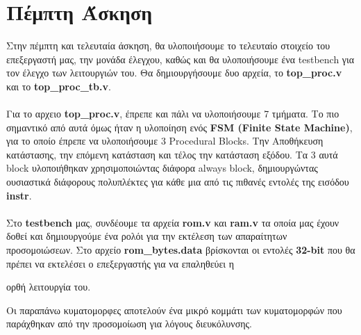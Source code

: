 \documentclass[a4paper,12pt]{report}
\def\tl{\textlatin}
\begin{document}
\chapter{Πέμπτη Άσκηση}
    \large Στην πέμπτη και τελευταία άσκηση, θα υλοποιήσουμε το τελευταίο στοιχείο του επεξεργαστή μας, την μονάδα έλεγχου, καθώς και θα υλοποιήσουμε ένα testbench για τον έλεγχο των λειτουργιών του. Θα δημιουργήσουμε δυο αρχεία, το \textbf{\tl{top\_proc.v}} και το \textbf{\tl{top\_proc\_tb.v}}. \\ \\
    Για το αρχειο \textbf{\tl{top\_proc.v}}, έπρεπε και πάλι να υλοποιήσουμε 7 τμήματα. Το πιο σημαντικό από αυτά όμως ήταν η υλοποίηση ενός \textbf{\tl{FSM (Finite State Machine)}}, για το οποίο έπρεπε να υλοποιήσουμε 3 \tl{Procedural Blocks}. Την Αποθήκευση κατάστασης, την επόμενη κατάσταση και τέλος την κατάσταση εξόδου. Τα 3 αυτά \tl{block} υλοποιήθηκαν χρησιμοποιώντας διάφορα \tl{always block}, δημιουργώντας ουσιαστικά διάφορους πολυπλέκτες για κάθε μια από τις πιθανές εντολές της εισόδου \textbf{\tl{instr}}.\\ \\
    Στο \textbf{\tl{testbench}} μας, συνδέουμε τα αρχεία \textbf{\tl{rom.v}} και \textbf{\tl{ram.v}} τα οποία μας έχουν δοθεί και δημιουργούμε ένα ρολόι για την εκτέλεση των απαραίτητων προσομοιώσεων. Στο αρχείο \textbf{\tl{rom\_bytes.data}} βρίσκονται οι εντολές \textbf{\tl{32-bit}} που θα πρέπει να 
    εκτελέσει ο επεξεργαστής για να επαληθεύει η\\
    \begin{figure}[h!]
        \centering
        \caption{}
    \end{figure}
    ορθή λειτουργία του.
    
    Οι παραπάνω κυματομορφες αποτελούν ένα μικρό κομμάτι των κυματομορφών που παράχθηκαν από την προσομοίωση για λόγους διευκόλυνσης.
    
\end{document}
